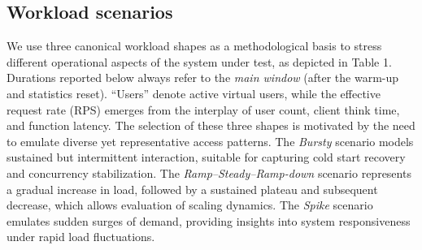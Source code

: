 \documentclass[11pt,a4paper]{article}
\begin{document}
\subsection{Workload scenarios}
We use three canonical workload shapes as a methodological basis to stress different operational aspects of the system under test, as depicted in Table 1. Durations reported below always refer to the \emph{main window} (after the warm-up and statistics reset). ``Users'' denote active virtual users, while the effective request rate (RPS) emerges from the interplay of user count, client think time, and function latency. The selection of these three shapes is motivated by the need to emulate diverse yet representative access patterns. The \emph{Bursty} scenario models sustained but intermittent interaction, suitable for capturing cold start recovery and concurrency stabilization. The \emph{Ramp--Steady--Ramp-down} scenario represents a gradual increase in load, followed by a sustained plateau and subsequent decrease, which allows evaluation of scaling dynamics. The \emph{Spike} scenario emulates sudden surges of demand, providing insights into system responsiveness under rapid load fluctuations.
\end{document}
